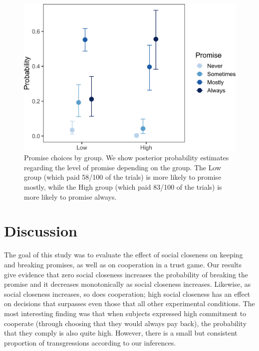 \documentclass[smallextended]{svjour3}       %
\begin{document}
\begin{figure}

{\centering \includegraphics[width=0.8\linewidth]{behavioral-promises_files/figure-latex/fig7-1} 

}

\caption{Promise choices by group. We show posterior probability estimates regarding the level of promise depending on the group. The Low group (which paid 58/100 of the trials) is more likely to promise mostly, while the High group (which paid 83/100 of the trials) is more likely to promise always.}\label{fig:fig7}
\end{figure}

\hypertarget{discussion}{%
\section{Discussion}\label{discussion}}

The goal of this study was to evaluate the effect of social closeness on
keeping and breaking promises, as well as on cooperation in a trust
game. Our results give evidence that zero social closeness increases the
probability of breaking the promise and it decreases monotonically as
social closeness increases. Likewise, as social closeness increases, so
does cooperation; high social closeness has an effect on decisions that
surpasses even those that all other experimental conditions. The most
interesting finding was that when subjects expressed high commitment to
cooperate (through choosing that they would always pay back), the
probability that they comply is also quite high. However, there is a
small but consistent proportion of transgressions according to our
inferences.
\end{document}
